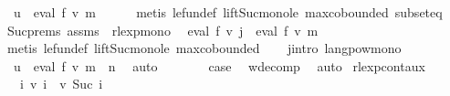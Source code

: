 \begin{isabellebody}
\ {}{\isacharcolon}{\kern0pt}\ {\isachardoublequoteopen}u\ {\isasymin}\ eval\ f\ {\isacharparenleft}{\kern0pt}v\ {\isacharquery}{\kern0pt}m{\isacharparenright}{\kern0pt}{\isachardoublequoteclose}\isanewline
\ \ \ \ \isamarkupfalse%
\ {\isacharparenleft}{\kern0pt}metis\ le{\isacharunderscore}{\kern0pt}fun{\isacharunderscore}{\kern0pt}def\ lift{\isacharunderscore}{\kern0pt}Suc{\isacharunderscore}{\kern0pt}mono{\isacharunderscore}{\kern0pt}le\ max{\isachardot}{\kern0pt}cobounded{}\ subset{\isacharunderscore}{\kern0pt}eq{\isacharparenright}{\kern0pt}\isanewline
\ \ \isamarkupfalse%
\ Suc{\isachardot}{\kern0pt}prems{\isacharparenleft}{\kern0pt}{}{\isacharparenright}{\kern0pt}\ assms\ {\isacharparenleft}{\kern0pt}{}{\isacharparenright}{\kern0pt}\ rlexp{\isacharunderscore}{\kern0pt}mono\ \isamarkupfalse%
\ {\isachardoublequoteopen}eval\ f\ {\isacharparenleft}{\kern0pt}v\ j{\isacharparenright}{\kern0pt}\ {\isasymsubseteq}\ eval\ f\ {\isacharparenleft}{\kern0pt}v\ {\isacharquery}{\kern0pt}m{\isacharparenright}{\kern0pt}{\isachardoublequoteclose}\isanewline
\ \ \ \ \isamarkupfalse%
\ {\isacharparenleft}{\kern0pt}metis\ le{\isacharunderscore}{\kern0pt}fun{\isacharunderscore}{\kern0pt}def\ lift{\isacharunderscore}{\kern0pt}Suc{\isacharunderscore}{\kern0pt}mono{\isacharunderscore}{\kern0pt}le\ max{\isachardot}{\kern0pt}cobounded{}{\isacharparenright}{\kern0pt}\isanewline
\ \ \isamarkupfalse%
\ j{\isacharunderscore}{\kern0pt}intro\ langpow{\isacharunderscore}{\kern0pt}mono\ \isamarkupfalse%
\ {}{\isacharcolon}{\kern0pt}\ {\isachardoublequoteopen}u{\isacharprime}{\kern0pt}\ {\isasymin}\ eval\ f\ {\isacharparenleft}{\kern0pt}v\ {\isacharquery}{\kern0pt}m{\isacharparenright}{\kern0pt}\ {\isacharcircum}{\kern0pt}{\isacharcircum}{\kern0pt}\ n{\isachardoublequoteclose}\ \isamarkupfalse%
\ auto\isanewline
\ \ \isamarkupfalse%
\ {}\ {}\ \isamarkupfalse%
\ {\isacharquery}{\kern0pt}case\ \isamarkupfalse%
\ w{\isacharunderscore}{\kern0pt}decomp\ \isamarkupfalse%
\ auto\isanewline
{}\isamarkupfalse%
%
\endisatagproof
{\isafoldproof}%
%
\isadelimproof
\isanewline
%
\endisadelimproof
\isanewline
{}\isamarkupfalse%
\ rlexp{\isacharunderscore}{\kern0pt}cont{\isacharunderscore}{\kern0pt}aux{}{\isacharcolon}{\kern0pt}\isanewline
\ \ \ {\isachardoublequoteopen}{\isasymforall}i{\isachardot}{\kern0pt}\ v\ i\ {\isasymle}\ v\ {\isacharparenleft}{\kern0pt}Suc\ i{\isacharparenright}{\kern0pt}{\isachardoublequoteclose}\isanewline

\end{isabellebody}
